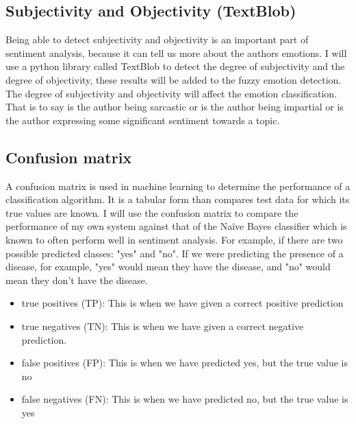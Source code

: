 \clearpage
\subsection{Subjectivity and Objectivity (TextBlob)}
Being able to detect subjectivity and objectivity is an important part of sentiment analysis, because it can tell us more about the authors emotions. I will use a python library called TextBlob to detect the degree of subjectivity and the degree of objectivity, these results will be added to the fuzzy emotion detection. The degree of subjectivity and objectivity will affect the emotion classification. That is to say is the author being sarcastic or is the author being impartial or is the author expressing some significant sentiment towards a topic.

\clearpage

\subsection{Confusion matrix}
A confusion matrix is used in machine learning to determine the performance of a classification algorithm. It is a tabular form than compares test data for which its true values are known. I will use the confusion matrix to compare the performance of my own system against that of the Naïve Bayes classifier which is known to often perform well in sentiment analysis.
For example, if there are two possible predicted classes: "yes" and "no". If we were predicting the presence of a disease, for example, "yes" would mean they have the disease, and "no" would mean they don't have the disease.
 \begin{itemize}
    
\item 
true positives (TP): This is when we have given a correct positive prediction

\item
true negatives (TN): This is when we have given a correct negative prediction.

\item 
false positives (FP): This is when we have predicted yes, but the true value is no

\item 
false negatives (FN): This is when we have predicted no, but the true value is yes
 
\end{itemize}


